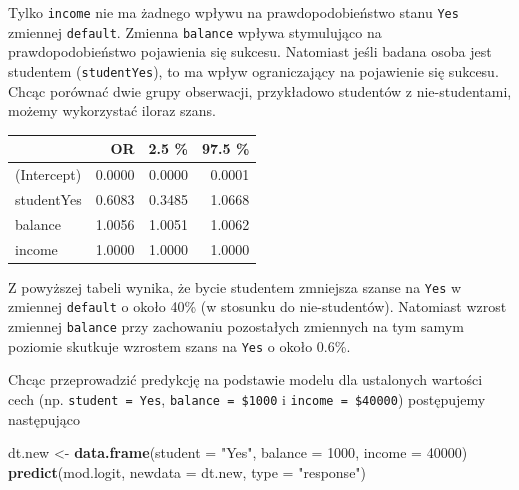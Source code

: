 \documentclass[]{book}
\newenvironment{Shaded}{\begin{snugshade}}{\end{snugshade}}
\newcommand{\DataTypeTok}[1]{\textcolor[rgb]{0.13,0.29,0.53}{#1}}
\newcommand{\DecValTok}[1]{\textcolor[rgb]{0.00,0.00,0.81}{#1}}
\newcommand{\KeywordTok}[1]{\textcolor[rgb]{0.13,0.29,0.53}{\textbf{#1}}}
\newcommand{\NormalTok}[1]{#1}
\newcommand{\OperatorTok}[1]{\textcolor[rgb]{0.81,0.36,0.00}{\textbf{#1}}}
\newcommand{\StringTok}[1]{\textcolor[rgb]{0.31,0.60,0.02}{#1}}
\theoremstyle{plain}
\theoremstyle{definition}
\theoremstyle{definition}
\theoremstyle{definition}
\theoremstyle{definition}
\theoremstyle{remark}
\begin{document}
Tylko \texttt{income} nie ma żadnego wpływu na prawdopodobieństwo stanu \texttt{Yes} zmiennej \texttt{default}. Zmienna \texttt{balance} wpływa stymulująco na prawdopodobieństwo pojawienia się sukcesu. Natomiast jeśli badana osoba jest studentem (\texttt{studentYes}), to ma wpływ ograniczający na pojawienie się sukcesu. Chcąc porównać dwie grupy obserwacji, przykładowo studentów z nie-studentami, możemy wykorzystać iloraz szans.

\begin{Shaded}
\end{Shaded}

\begin{tabular}{l|r|r|r}
\hline
  & OR & 2.5 \% & 97.5 \%\\
\hline
(Intercept) & 0.0000 & 0.0000 & 0.0001\\
\hline
studentYes & 0.6083 & 0.3485 & 1.0668\\
\hline
balance & 1.0056 & 1.0051 & 1.0062\\
\hline
income & 1.0000 & 1.0000 & 1.0000\\
\hline
\end{tabular}

Z powyższej tabeli wynika, że bycie studentem zmniejsza szanse na \texttt{Yes} w zmiennej \texttt{default} o około 40\% (w stosunku do nie-studentów). Natomiast wzrost zmiennej \texttt{balance} przy zachowaniu pozostałych zmiennych na tym samym poziomie skutkuje wzrostem szans na \texttt{Yes} o około 0.6\%.

Chcąc przeprowadzić predykcję na podstawie modelu dla ustalonych wartości cech (np. \texttt{student\ =\ Yes}, \texttt{balance\ =\ \$1000} i \texttt{income\ =\ \$40000}) postępujemy następująco

\begin{Shaded}
\begin{Highlighting}[]
\NormalTok{dt.new <-}\StringTok{ }\KeywordTok{data.frame}\NormalTok{(}\DataTypeTok{student =} \StringTok{"Yes"}\NormalTok{, }\DataTypeTok{balance =} \DecValTok{1000}\NormalTok{, }\DataTypeTok{income =} \DecValTok{40000}\NormalTok{)}
\KeywordTok{predict}\NormalTok{(mod.logit, }\DataTypeTok{newdata =}\NormalTok{ dt.new, }\DataTypeTok{type =} \StringTok{"response"}\NormalTok{)}
\end{Highlighting}
\end{Shaded}
\end{document}
